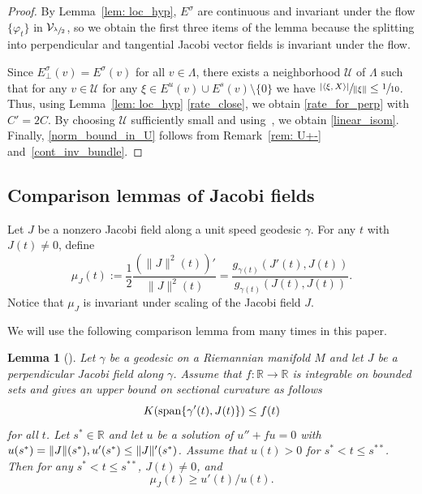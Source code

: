 \documentclass[JEP,XML,SOM,Unicode,NoFloatCountersInSection]{cedram}
\newtheorem{lemma}[theorem]{Lemma}
\theoremstyle{definition}
\newcommand{\field}[1]{\mathbb{#1}}
\newcommand{\R}{\field{R}}
\let\phi\varphi
\renewcommand{\>}{{\rangle}}
\newcommand{\<}{{\langle}}
\begin{document}
\begin{proof}
By Lemma~\ref{lem: loc_hyp}, $E^{\sigma}$ are continuous and invariant under the flow $\{\phi_t\}$ in $\mathcal V_{\sfrac{\lambda}{2}}$, so we obtain the first three items of the lemma because the splitting into perpendicular and tangential Jacobi vector fields is invariant under the flow.

Since $E^{\sigma}_{\bot}(v)=E^{\sigma}(v)$ for all $v\in\Lambda$, there exists a neighborhood $\mathcal U$ of $\Lambda$ such that for any $v\in\mathcal U$ for any $\xi\in E^u(v)\cup E^s(v)\setminus\{0\}$ we have $\sfrac{|\<\xi,X\>|}{\|\xi\|}\leq \sfrac{1}{10}$. Thus, using Lemma~\ref{lem: loc_hyp} \eqref{rate_close}, we obtain \eqref{rate_for_perp} with $C'=2C$. By choosing $\mathcal U$ sufficiently small and using~\cite[Prop.\,2.6]{E73}, we obtain \eqref{linear_isom}.
Finally, \eqref{norm_bound_in_U} follows from Remark~\ref{rem: U+-} and~\eqref{cont_inv_bundle}.
\end{proof}

\subsection{Comparison lemmas of Jacobi fields}
Let $J$ be a nonzero Jacobi field along a unit speed geodesic $\gamma$. For any $t$ with $J(t)\neq 0$, define
\begin{equation}\label{def: mu}
\mu_J(t):= \frac{1}{2}\frac{\left(\|J\|^2(t)\right)'}{\|J\|^2(t)}=\frac{g_{\gamma(t)}(J'(t), J(t))}{g_{\gamma(t)}(J(t), J(t))}.
\end{equation}
Notice that $\mu_J$ is invariant under scaling of the Jacobi field $J$.

We will use the following comparison lemma from \cite{G75} many times in this paper.
\begin{lemma}[{\cite[Lem.\,3]{G75}}]\label{lem: comp_thm}
Let $\gamma$ be a geodesic on a Riemannian manifold $M$ and let $J$ be a perpendicular Jacobi field along $\gamma$. Assume that $f\colon\mathbb{R}\to\mathbb{R}$ is integrable on bounded sets and gives an upper bound on sectional curvature as follows
\[
K(\textup{span}\{\gamma'(t), J(t)\})\leq f(t)
\] for all $t$. Let $s^*\in\R$ and let $u$ be a solution of $u''+fu=0$ with $u(s^*)=\|J\|(s^*), u'(s^*)\\ \leq \|J\|'(s^*)$. Assume that $u(t)>0$ for $s^*<t\leq s^{**}$. Then for any $s^*<t\leq s^{**}$, $J(t)\neq 0$, and
\[
\mu_J(t)\geq u'(t)/u(t).
\]
\end{lemma}
\end{document}
